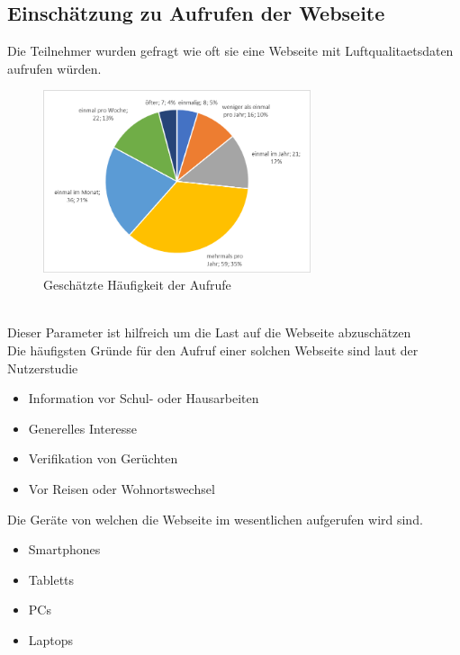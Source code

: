 \subsection{Einschätzung zu Aufrufen der Webseite}
Die Teilnehmer wurden gefragt wie oft sie eine Webseite mit \gls{Luftqualitaetsdaten} aufrufen würden.
\\
\begin{figure}[h]
    \centering
    \includegraphics[width=0.7\textwidth]{media/diagram/aufrufe.png}
    \caption{Geschätzte Häufigkeit der Aufrufe}
\end{figure}
\\
Dieser Parameter ist hilfreich um die Last auf die Webseite abzuschätzen
\\
Die häufigsten Gründe für den Aufruf einer solchen Webseite sind laut der Nutzerstudie
\begin{itemize} [noitemsep]
    \item Information vor Schul- oder Hausarbeiten
    \item Generelles Interesse
    \item Verifikation von Gerüchten
    \item Vor Reisen oder Wohnortswechsel
\end{itemize}
Die Geräte von welchen die Webseite im wesentlichen aufgerufen wird sind.
\begin{itemize} [noitemsep]
    \item Smartphones
    \item Tabletts
    \item PCs
    \item Laptops
\end{itemize}

